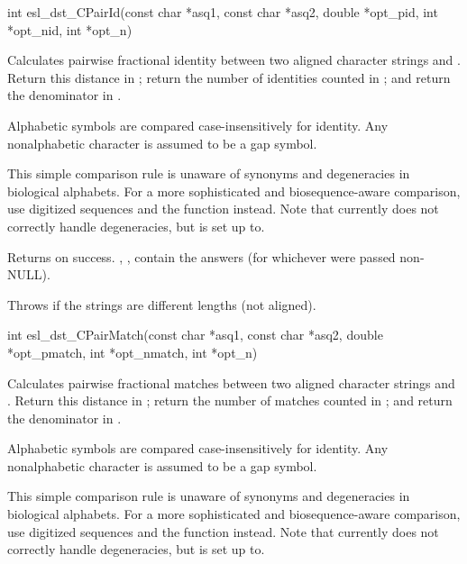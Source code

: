 \begin{sreapi}
\hypertarget{func:esl_dst_CPairId()}
{\item[int esl\_dst\_CPairId(const char *asq1, const char *asq2, 
		double *opt\_pid, int *opt\_nid, int *opt\_n)]}

Calculates pairwise fractional identity between two
aligned character strings  and . 
Return this distance in ; return the
number of identities counted in ; and
return the denominator  in
.

Alphabetic symbols \ccode{[a-zA-Z]} are compared
case-insensitively for identity. Any nonalphabetic
character is assumed to be a gap symbol.

This simple comparison rule is unaware of synonyms and
degeneracies in biological alphabets.  For a more
sophisticated and biosequence-aware comparison, use
digitized sequences and the  function
instead. Note that currently  does
not correctly handle degeneracies, but is set up to.

Returns  on success. , , 
contain the answers (for whichever were passed non-NULL). 

Throws  if the strings are different lengths
(not aligned).


\hypertarget{func:esl_dst_CPairMatch()}
{\item[int esl\_dst\_CPairMatch(const char *asq1, const char *asq2, 
		   double *opt\_pmatch, int *opt\_nmatch, int *opt\_n)]}

Calculates pairwise fractional matches between two
aligned character strings  and . 
Return this distance in ; return the
number of matches counted in ; and
return the denominator  in
.

Alphabetic symbols \ccode{[a-zA-Z]} are compared
case-insensitively for identity. Any nonalphabetic
character is assumed to be a gap symbol.

This simple comparison rule is unaware of synonyms and
degeneracies in biological alphabets.  For a more
sophisticated and biosequence-aware comparison, use
digitized sequences and the  function
instead. Note that currently  does
not correctly handle degeneracies, but is set up to.


\end{sreapi}
